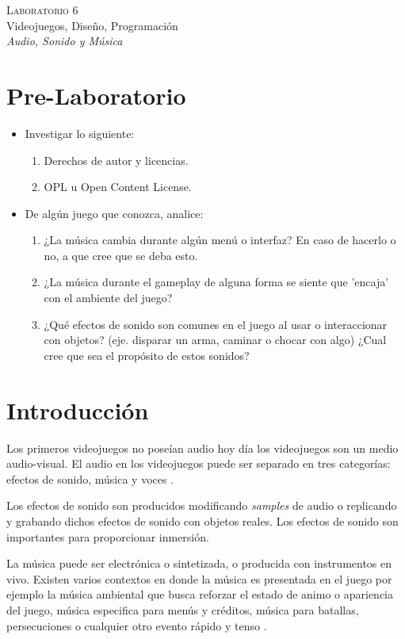 \begin{center}
\textsc{\Large Laboratorio 6}~\\
{\large Videojuegos, Diseño, Programación}~\\
\emph{Audio, Sonido y Música}
\end{center}

\section{Pre-Laboratorio}
\begin{itemize}
\item Investigar lo siguiente:
\begin{enumerate}
  \item Derechos de autor y licencias.
  \item OPL u Open Content License.
\end{enumerate}
\item De algún juego que conozca, analice:
\begin{enumerate}
  \item ¿La música cambia durante algún menú o interfaz? En caso de hacerlo o no, a que cree que se deba esto.
  \item ¿La música durante el gameplay de alguna forma se siente que 'encaja' con el ambiente del juego?
  \item ¿Qué efectos de sonido son comunes en el juego al usar o interaccionar con objetos? (eje. disparar un arma, caminar o chocar con algo) ¿Cual cree que sea el propósito de estos sonidos?
\end{enumerate}
\end{itemize}


\section{Introducción}
Los primeros videojuegos no poseían audio hoy día los videojuegos son un medio audio-visual. El audio en los videojuegos puede ser separado en tres categorías: efectos de sonido, música y voces \cite{erikgamedevelopment}\cite{valve_audio}.

Los efectos de sonido son producidos modificando \emph{samples} de audio o replicando y grabando dichos efectos de sonido con objetos reales. Los efectos de sonido son importantes para proporcionar inmersión. 

La música puede ser electrónica o sintetizada, o producida con instrumentos en vivo. Existen varios contextos en donde la música es presentada en el juego por ejemplo la música ambiental que busca reforzar el estado de animo o apariencia del juego, música especifica para menús y créditos, música para batallas, persecuciones o cualquier otro evento rápido y tenso \cite[p.~188]{bobbatesgamedesign}.

